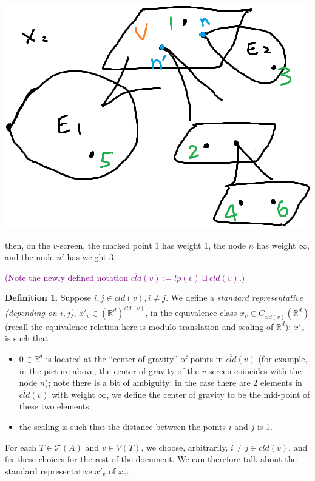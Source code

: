 \documentclass[11pt]{article}
\theoremstyle{definition}
\newtheorem{dfn}[thm]{Definition}
\theoremstyle{remark}
\def\ov#1{\overline{#1}}
\def\R{\mathbb{R}}
\def\cT{\mathcal{T}}
\def\cmt#1{\textcolor{purple}{(#1)}}
\begin{document}
\includegraphics[scale=0.5]{ST2_fig}

then, on the $v$-screen, the marked point 1 has weight 1, the node $n$ has weight $\infty$, and the node $n'$ has weight 3.

\cmt{Note the newly defined notation $\ov{cld}(v):=lp(v)\sqcup cld(v)$.}

\begin{dfn}\label{screennormalize_dfn}
Suppose $i,j\in \ov{cld}(v), i\neq j$. 
We define a {\it standard representative (depending on $i,j$)}, $x'_v\in (\R^d)^{\ov{cld}(v)}$, 
in the equivalence class $x_v\in C_{\ov{cld}(v)}(\R^d)$ (recall the equivalence relation here is modulo translation and scaling of $\R^d$):
$x'_v$ is such that 
\begin{itemize}
\item $0\in\R^d$ is located at the ``center of gravity'' of points in $\ov{cld}(v)$ (for example, in the picture above, the center of gravity of the $v$-screen coincides with the node $n$); note there is a bit of ambiguity: in the case there are 2 elements in $\ov{cld}(v)$ with weight $\infty$, we define the center of gravity to be the mid-point of these two elements; 

\item the scaling is such that the distance between the points $i$ and $j$ is 1. 
\end{itemize}
\end{dfn}

For each $T\in \cT(A)$ and $v\in V(T)$, we choose, arbitrarily, $i\neq j\in \ov{cld}(v)$, and fix these choices for the rest of the document. 
We can therefore talk about the standard representative $x'_v$ of $x_v$. 
\end{document}
